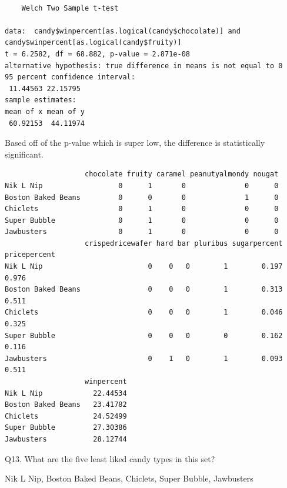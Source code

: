 \documentclass[
  letterpaper,
  DIV=11,
  numbers=noendperiod]{scrartcl}
\newenvironment{Shaded}{\begin{snugshade}}{\end{snugshade}}
\newcommand{\AttributeTok}[1]{\textcolor[rgb]{0.40,0.45,0.13}{#1}}
\newcommand{\ConstantTok}[1]{\textcolor[rgb]{0.56,0.35,0.01}{#1}}
\newcommand{\DecValTok}[1]{\textcolor[rgb]{0.68,0.00,0.00}{#1}}
\newcommand{\FunctionTok}[1]{\textcolor[rgb]{0.28,0.35,0.67}{#1}}
\newcommand{\NormalTok}[1]{\textcolor[rgb]{0.00,0.23,0.31}{#1}}
\newcommand{\SpecialCharTok}[1]{\textcolor[rgb]{0.37,0.37,0.37}{#1}}
\begin{document}
\begin{verbatim}

    Welch Two Sample t-test

data:  candy$winpercent[as.logical(candy$chocolate)] and candy$winpercent[as.logical(candy$fruity)]
t = 6.2582, df = 68.882, p-value = 2.871e-08
alternative hypothesis: true difference in means is not equal to 0
95 percent confidence interval:
 11.44563 22.15795
sample estimates:
mean of x mean of y 
 60.92153  44.11974 
\end{verbatim}

Based off of the p-value which is super low, the difference is
statistically significant.

\begin{Shaded}
\end{Shaded}

\begin{verbatim}
                   chocolate fruity caramel peanutyalmondy nougat
Nik L Nip                  0      1       0              0      0
Boston Baked Beans         0      0       0              1      0
Chiclets                   0      1       0              0      0
Super Bubble               0      1       0              0      0
Jawbusters                 0      1       0              0      0
                   crispedricewafer hard bar pluribus sugarpercent pricepercent
Nik L Nip                         0    0   0        1        0.197        0.976
Boston Baked Beans                0    0   0        1        0.313        0.511
Chiclets                          0    0   0        1        0.046        0.325
Super Bubble                      0    0   0        0        0.162        0.116
Jawbusters                        0    1   0        1        0.093        0.511
                   winpercent
Nik L Nip            22.44534
Boston Baked Beans   23.41782
Chiclets             24.52499
Super Bubble         27.30386
Jawbusters           28.12744
\end{verbatim}

Q13. What are the five least liked candy types in this set?

Nik L Nip, Boston Baked Beans, Chiclets, Super Bubble, Jawbusters

\begin{Shaded}
\end{Shaded}
\end{document}

